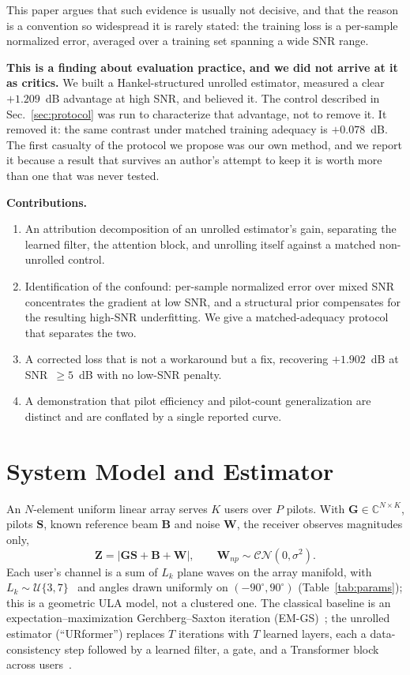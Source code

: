 \documentclass[journal]{IEEEtran}
\newcommand{\bG}{\mathbf{G}}
\newcommand{\bS}{\mathbf{S}}
\newcommand{\bB}{\mathbf{B}}
\newcommand{\bW}{\mathbf{W}}
\newcommand{\bZ}{\mathbf{Z}}
\newcommand{\CN}{\mathcal{CN}}
\begin{document}
This paper argues that such evidence is usually not decisive, and that the
reason is a convention so widespread it is rarely stated: the training loss is
a per-sample normalized error, averaged over a training set spanning a wide
SNR range.

\textbf{This is a finding about evaluation practice, and we did not arrive at
it as critics.} We built a Hankel-structured unrolled estimator, measured a
clear $+1.209$~dB advantage at high SNR, and believed it. The control
described in Sec.~\ref{sec:protocol} was run to characterize that advantage,
not to remove it. It removed it: the same contrast under matched training
adequacy is $+0.078$~dB. The first casualty of the protocol we propose was our
own method, and we report it because a result that survives an author's
attempt to keep it is worth more than one that was never tested.

\textbf{Contributions.}
\begin{enumerate}
\item An attribution decomposition of an unrolled estimator's gain, separating
the learned filter, the attention block, and unrolling itself against a matched
non-unrolled control.
\item Identification of the confound: per-sample normalized error over mixed
SNR concentrates the gradient at low SNR, and a structural prior compensates
for the resulting high-SNR underfitting. We give a matched-adequacy protocol
that separates the two.
\item A corrected loss that is not a workaround but a fix, recovering
$+1.902$~dB at SNR~$\ge5$~dB with no low-SNR penalty.
\item A demonstration that pilot efficiency and pilot-count generalization are
distinct and are conflated by a single reported curve.
\end{enumerate}

\section{System Model and Estimator}

An $N$-element uniform linear array serves $K$ users over $P$ pilots. With
$\bG\in\mathbb{C}^{N\times K}$, pilots $\bS$, known reference beam $\bB$ and
noise $\bW$, the receiver observes magnitudes only,
\begin{equation}
\bZ=\left|\bG\bS+\bB+\bW\right|,\qquad \bW_{np}\sim\CN(0,\sigma^2).
\label{eq:fwd}
\end{equation}
Each user's channel is a sum of $L_k$ plane waves on the array manifold,
with $L_k\sim\mathcal{U}\{3,7\}$~\cite{xu2025} and angles drawn uniformly on
$(-90^\circ,90^\circ)$ (Table~\ref{tab:params}); this is a geometric ULA model,
not a clustered one. The
classical baseline is an expectation--maximization Gerchberg--Saxton iteration
(EM-GS)~\cite{gerchberg1972}; the unrolled estimator
(``URformer'') replaces $T$ iterations with $T$ learned layers, each a
data-consistency step followed by a learned filter, a gate, and a
Transformer block across users~\cite{xiao2026}.
\end{document}
